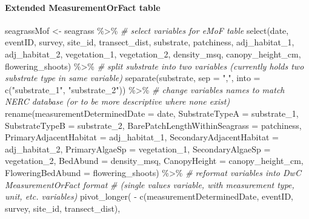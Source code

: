 \documentclass[
]{book}
\newenvironment{Shaded}{\begin{snugshade}}{\end{snugshade}}
\newcommand{\AttributeTok}[1]{\textcolor[rgb]{0.77,0.63,0.00}{#1}}
\newcommand{\CommentTok}[1]{\textcolor[rgb]{0.56,0.35,0.01}{\textit{#1}}}
\newcommand{\FunctionTok}[1]{\textcolor[rgb]{0.00,0.00,0.00}{#1}}
\newcommand{\NormalTok}[1]{#1}
\newcommand{\OtherTok}[1]{\textcolor[rgb]{0.56,0.35,0.01}{#1}}
\newcommand{\SpecialCharTok}[1]{\textcolor[rgb]{0.00,0.00,0.00}{#1}}
\newcommand{\StringTok}[1]{\textcolor[rgb]{0.31,0.60,0.02}{#1}}
\begin{document}
\hypertarget{extended-measurementorfact-table}{%
\paragraph{Extended MeasurementOrFact table}\label{extended-measurementorfact-table}}

\begin{Shaded}
\begin{Highlighting}[]
\NormalTok{seagrassMof }\OtherTok{\textless{}{-}}
\NormalTok{  seagrass }\SpecialCharTok{\%\textgreater{}\%}
  \CommentTok{\# select variables for eMoF table}
  \FunctionTok{select}\NormalTok{(date,}
\NormalTok{         eventID, survey, site\_id, transect\_dist,}
\NormalTok{         substrate, patchiness, adj\_habitat\_1, adj\_habitat\_2,}
\NormalTok{         vegetation\_1, vegetation\_2,}
\NormalTok{         density\_msq, canopy\_height\_cm, flowering\_shoots) }\SpecialCharTok{\%\textgreater{}\%}
  \CommentTok{\# split substrate into two variables (currently holds two substrate type in same variable)}
  \FunctionTok{separate}\NormalTok{(substrate, }\AttributeTok{sep =} \StringTok{","}\NormalTok{, }\AttributeTok{into =} \FunctionTok{c}\NormalTok{(}\StringTok{"substrate\_1"}\NormalTok{, }\StringTok{"substrate\_2"}\NormalTok{)) }\SpecialCharTok{\%\textgreater{}\%}
  \CommentTok{\# change variables names to match NERC database (or to be more descriptive where none exist)}
  \FunctionTok{rename}\NormalTok{(}\AttributeTok{measurementDeterminedDate   =}\NormalTok{ date,}
         \AttributeTok{SubstrateTypeA              =}\NormalTok{ substrate\_1,}
         \AttributeTok{SubstrateTypeB              =}\NormalTok{ substrate\_2,}
         \AttributeTok{BarePatchLengthWithinSeagrass =}\NormalTok{ patchiness,}
         \AttributeTok{PrimaryAdjacentHabitat      =}\NormalTok{ adj\_habitat\_1,}
         \AttributeTok{SecondaryAdjacentHabitat    =}\NormalTok{ adj\_habitat\_2,}
         \AttributeTok{PrimaryAlgaeSp              =}\NormalTok{ vegetation\_1,}
         \AttributeTok{SecondaryAlgaeSp            =}\NormalTok{ vegetation\_2,}
         \AttributeTok{BedAbund                    =}\NormalTok{ density\_msq,}
         \AttributeTok{CanopyHeight                =}\NormalTok{ canopy\_height\_cm,}
         \AttributeTok{FloweringBedAbund           =}\NormalTok{ flowering\_shoots) }\SpecialCharTok{\%\textgreater{}\%}  
  \CommentTok{\# reformat variables into DwC MeasurementOrFact format}
  \CommentTok{\# (single values variable, with measurement type, unit, etc. variables)}
  \FunctionTok{pivot\_longer}\NormalTok{( }\SpecialCharTok{{-}} \FunctionTok{c}\NormalTok{(measurementDeterminedDate, eventID, survey, site\_id, transect\_dist),}

\end{Highlighting}
\end{Shaded}
\end{document}
